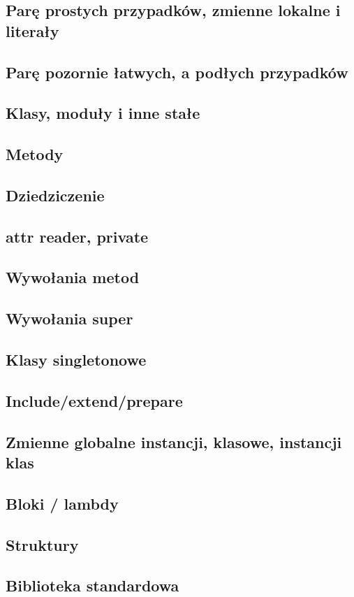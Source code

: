 \documentclass[declaration,shortabstract]{iithesis}
\begin{document}
\subsection{Parę prostych przypadków, zmienne lokalne i literały}
\subsection{Parę pozornie łatwych, a podłych przypadków}
\subsection{Klasy, moduły i inne stałe}
\subsection{Metody}
\subsection{Dziedziczenie}
\subsection{attr reader, private}
\subsection{Wywołania metod}
\subsection{Wywołania super}
\subsection{Klasy singletonowe}
\subsection{Include/extend/prepare}
\subsection{Zmienne globalne instancji, klasowe, instancji klas}
\subsection{Bloki / lambdy}
\subsection{Struktury}
\subsection{Biblioteka standardowa}
\end{document}
